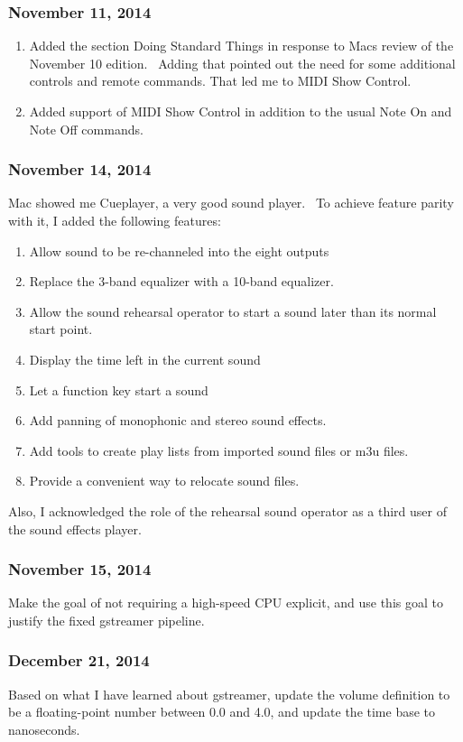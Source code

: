 \documentclass[letterpaper]{article}
\newcommand\liststyleLxxvi{%
\renewcommand\theenumi{\arabic{enumi}}
\renewcommand\theenumii{\arabic{enumii}}
\renewcommand\theenumiii{\arabic{enumiii}}
\renewcommand\theenumiv{\arabic{enumiv}}
\renewcommand\labelenumi{\theenumi.}
\renewcommand\labelenumii{\theenumii.}
\renewcommand\labelenumiii{\theenumiii.}
\renewcommand\labelenumiv{\theenumiv.}
}
\newcommand\liststyleLxxvii{%
\renewcommand\theenumi{\arabic{enumi}}
\renewcommand\theenumii{\arabic{enumii}}
\renewcommand\theenumiii{\arabic{enumiii}}
\renewcommand\theenumiv{\arabic{enumiv}}
\renewcommand\labelenumi{\theenumi.}
\renewcommand\labelenumii{\theenumii.}
\renewcommand\labelenumiii{\theenumiii.}
\renewcommand\labelenumiv{\theenumiv.}
}
\begin{document}
\subsubsection{November 11, 2014}
\liststyleLxxvi
\begin{enumerate}
\item Added the section Doing Standard Things in response to
Mac{\textquotesingle}s review of the November 10 edition. \ Adding that
pointed out the need for some additional controls and remote commands.
That led me to MIDI Show Control.
\item Added support of MIDI Show Control in addition to the usual Note
On and Note Off commands.
\end{enumerate}
\subsubsection{November 14, 2014}
Mac showed me Cueplayer, a very good sound player. \ To achieve feature
parity with it, I added the following features:

\liststyleLxxvii
\begin{enumerate}
\item Allow sound to be re-channeled into the eight outputs
\item Replace the 3-band equalizer with a 10-band equalizer.
\item Allow the sound rehearsal operator to start a sound later than its
normal start point.
\item Display the time left in the current sound
\item Let a function key start a sound
\item Add panning of monophonic and stereo sound effects.
\item Add tools to create play lists from imported sound files or m3u
files.
\item Provide a convenient way to relocate sound files.
\end{enumerate}
Also, I acknowledged the role of the rehearsal sound operator as a third
user of the sound effects player.

\subsubsection{November 15, 2014}
Make the goal of not requiring a high-speed CPU explicit, and use this
goal to justify the fixed gstreamer pipeline.

\subsubsection[December 21, 2014]{December 21, 2014}
Based on what I have learned about gstreamer, update the volume
definition to be a floating-point number between 0.0 and 4.0, and
update the time base to nanoseconds.


\bigskip
\end{document}
